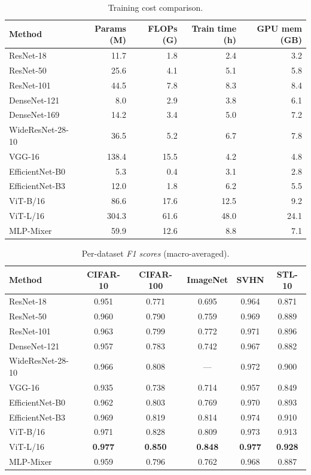 \documentclass{article}
\begin{document}
\begin{table}[h]
\caption{Training cost comparison.}
\label{tab:cost}
\centering
\begin{tabular}{lrrrr}
\toprule
\textbf{Method} & \textbf{Params (M)} & \textbf{FLOPs (G)} & \textbf{Train time (h)} & \textbf{GPU mem (GB)} \\
\midrule
ResNet-18       & 11.7  & 1.8  & 2.4  & 3.2 \\
ResNet-50       & 25.6  & 4.1  & 5.1  & 5.8 \\
ResNet-101      & 44.5  & 7.8  & 8.3  & 8.4 \\
DenseNet-121    & 8.0   & 2.9  & 3.8  & 6.1 \\
DenseNet-169    & 14.2  & 3.4  & 5.0  & 7.2 \\
WideResNet-28-10 & 36.5 & 5.2  & 6.7  & 7.8 \\
VGG-16          & 138.4 & 15.5 & 4.2  & 4.8 \\
EfficientNet-B0 & 5.3   & 0.4  & 3.1  & 2.8 \\
EfficientNet-B3 & 12.0  & 1.8  & 6.2  & 5.5 \\
ViT-B/16        & 86.6  & 17.6 & 12.5 & 9.2 \\
ViT-L/16        & 304.3 & 61.6 & 48.0 & 24.1 \\
MLP-Mixer       & 59.9  & 12.6 & 8.8  & 7.1 \\
\bottomrule
\end{tabular}
\end{table}

\begin{table}[h]
\caption{Per-dataset \emph{F1 scores} (macro-averaged).}
\label{tab:f1}
\centering
\begin{tabular}{lccccc}
\toprule
\textbf{Method} & \textbf{CIFAR-10} & \textbf{CIFAR-100} & \textbf{ImageNet} & \textbf{SVHN} & \textbf{STL-10} \\
\midrule
ResNet-18       & 0.951 & 0.771 & 0.695 & 0.964 & 0.871 \\
ResNet-50       & 0.960 & 0.790 & 0.759 & 0.969 & 0.889 \\
ResNet-101      & 0.963 & 0.799 & 0.772 & 0.971 & 0.896 \\
DenseNet-121    & 0.957 & 0.783 & 0.742 & 0.967 & 0.882 \\
WideResNet-28-10 & 0.966 & 0.808 & ---   & 0.972 & 0.900 \\
VGG-16          & 0.935 & 0.738 & 0.714 & 0.957 & 0.849 \\
EfficientNet-B0 & 0.962 & 0.803 & 0.769 & 0.970 & 0.893 \\
EfficientNet-B3 & 0.969 & 0.819 & 0.814 & 0.974 & 0.910 \\
ViT-B/16        & 0.971 & 0.828 & 0.809 & 0.973 & 0.913 \\
ViT-L/16        & \textbf{0.977} & \textbf{0.850} & \textbf{0.848} & \textbf{0.977} & \textbf{0.928} \\
MLP-Mixer       & 0.959 & 0.796 & 0.762 & 0.968 & 0.887 \\
\bottomrule
\end{tabular}
\end{table}
\end{document}
